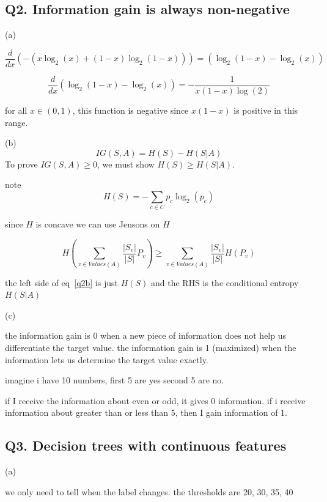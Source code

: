 \documentclass{report}
\begin{document}
\subsection*{Q2. Information gain is always non-negative}
(a)

\begin{equation}
    \frac{d}{dx} \left( -\left( x\log_2(x) + (1-x)\log_2(1-x) \right) \right) = (\log_2(1-x) - \log_2(x))
\end{equation}

\begin{equation}
    \frac{d}{dx} \left( \log_2(1-x) - \log_2(x) \right)= -\frac{1}{x(1-x)\log(2)}
\end{equation}

for all \(x\in(0,1)\), this function is negative since \(x(1-x)\) is positive in this range. 


(b)
$$IG(S, A) = H(S) - H(S|A)$$
To prove $IG(S, A) \geq 0$, we must show $H(S) \geq H(S|A)$.

note
$$H(S) = -\sum_{c \in C} p_c \log_2(p_c)$$

since \(H\) is concave we can use Jensons on \(H\)

\begin{equation}\label{q2b}
    H\left( \sum_{v \in Values(A)} \frac{|S_v|}{|S|} P_v \right) \geq \sum_{v \in Values(A)} \frac{|S_v|}{|S|} H(P_v)
\end{equation}

the left side of eq~\ref{q2b} is just \(H(S)\) and the RHS is the conditional entropy \(H(S|A)\)

(c)

the information gain is 0 when a new piece of information does not help us differentiate the target value. the information gain is 1 (maximized) when the information lets us determine the target value exactly. 

imagine i have 10 numbers, first 5 are yes second 5 are no. 

if I receive the information about even or odd, it gives 0 information. if i receive information about greater than or less than 5, then I gain information of 1. 

\subsection*{Q3. Decision trees with continuous features}
(a)

we only need to tell when the label changes. the thresholds are 20, 30, 35, 40
\end{document}
